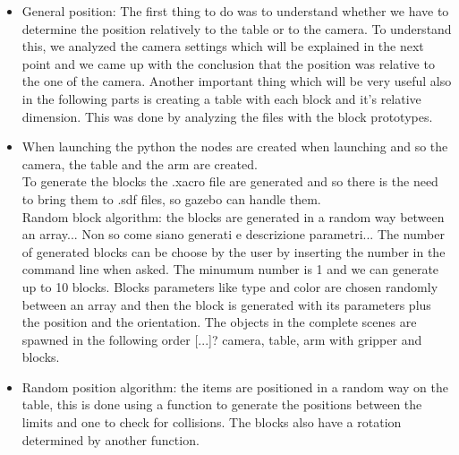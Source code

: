 \documentclass[12pt,a4paper]{article}
\begin{document}
\begin{itemize}
    \item General position: The first thing to do was to understand whether we have to determine the position relatively to the table or to the camera. To understand this, we analyzed the camera settings which will be explained in the next point and we came up with the conclusion that the position was relative to the one of the camera.
    Another important thing which will be very useful also in the following parts is creating a table with each block and it's relative dimension. This was done by analyzing the files with the block prototypes.
    \item When launching the python the nodes are created when launching and so the camera, the table and the arm are created.\\
    To generate the blocks the .xacro file are generated and so there is the need to bring them to .sdf files, so gazebo can handle them.\\
    Random block algorithm: the blocks are generated in a random way between an array... Non so come siano generati e descrizione parametri...
    The number of generated blocks can be choose by the user by inserting the number in the command line when asked. The minumum number is 1 and we can generate up to 10 blocks. Blocks parameters like type and color are chosen randomly between an array and then the block is generated with its parameters plus the position and the orientation.
    The objects in the complete scenes are spawned in the following order [...]? camera, table, arm with gripper and blocks.
    \item Random position algorithm: the items are positioned in a random way on the table, this is done using a function to generate the positions between the limits and one to check for collisions. The blocks also have a rotation determined by another function.
\end{itemize}
\end{document}
